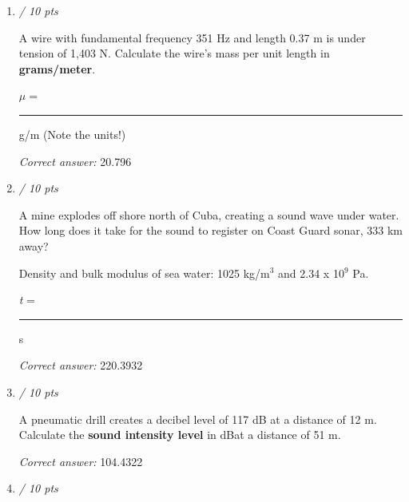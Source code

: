 \documentclass[11pt]{article}
\begin{document}
\begin{enumerate}[leftmargin=*,label=\textbf{Question \arabic*.}]
\begin{itemize}
  \item \textbf{[correct]} 6.67 m
  \item 0.942 m
  \item 5 m
  \item 10 m
\end{itemize}
\textit{Answer 8:}
\begin{itemize}
  \item \textbf{[correct]} 0.667 m/s
  \item 3.14 m/s
  \item 2.35 m/s
  \item 1.50 m/s
\end{itemize}
\textit{Answer 9:}
\begin{itemize}
  \item 3.14 m/s
  \item 10 m/s
  \item 6.67 m/s
  \item \textbf{[correct]} 2.22 m/s
\end{itemize}

\item \hfill \textit{/ 10 pts}

A wire with fundamental frequency 351 Hz and length 0.37 m is under tension of 1,403 N. Calculate the wire's mass per unit length in \textbf{grams/meter}.



$\mu=$ \rule{2cm}{0.4pt} g/m (Note the units!)

\textit{Correct answer: } 20.796

\item \hfill \textit{/ 10 pts}

A mine explodes off shore north of Cuba, creating a sound wave under water. How long does it take for the sound to register on Coast Guard sonar, 333 km away?

Density and bulk modulus of sea water: 1025 kg/m$^{3}$ and 2.34 x 10$^{9}$ Pa.



\emph{t} = \rule{2cm}{0.4pt} s

\textit{Correct answer: } 220.3932

\item \hfill \textit{/ 10 pts}

A pneumatic drill creates a decibel level of 117 dB at a distance of 12 m. Calculate the \textbf{sound intensity level }in dBat a distance of 51 m.

\textit{Correct answer: } 104.4322

\item \hfill \textit{/ 10 pts}


\end{enumerate}
\end{document}
